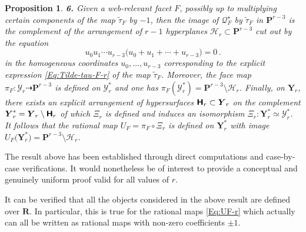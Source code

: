 \documentclass[11pt]{amsart}
\newcommand{\sk}{\smallskip}
\newtheorem{prop}[thm]{Proposition}
\begin{document}
\begin{prop}
\noindent 
{\bf 6.} Given a web-relevant facet $F$, possibly up to multiplying certain components of the map $\tilde \tau_F$ by $-1$, then the image of $\boldsymbol{\mathcal Q}_F^\star$ by $\tilde \tau_F$ in $\mathbf P^{r-3}$ is the complement of the arrangement of $r-1$ hyperplanes $\mathcal H_r\subset \mathbf P^{r-3}$ cut out by the equation 
$$
u_0u_1\cdots u_{r-3}\big( u_0+u_1+\cdots+  u_{r-3}\big)=0\, . 
$$
in the homogeneous coordinates $u_0,\ldots,u_{r-3}$ corresponding to the explicit expression \eqref{Eq:Tilde-tau-F-r} of the map $\tilde \tau_F$.  Moreover, 
the face map $\pi_F: \boldsymbol{\mathcal Y}_r\dashrightarrow \mathbf P^{r-3}$ is defined on $\boldsymbol{\mathcal Y}_r^*$ and one has $\pi_F( \boldsymbol{\mathcal Y}_r^*)=\mathbf P^{r-3}\setminus \mathcal H_r$. 
Finally, on $\boldsymbol{Y}_r$, there exists an explicit arrangement of hypersurfaces $\boldsymbol{\sf H}_r\subset \boldsymbol{Y}_r$ on the complement 
$\boldsymbol{Y}_r^*=\boldsymbol{Y}_r\setminus \boldsymbol{\sf H}_r$ of which $\Xi_r$ is defined and induces an isomorphism $\Xi_r : \boldsymbol{Y}_r^*\simeq \boldsymbol{\mathcal Y}_r^*$. It follows that the rational map $U_F= \pi_F\circ \Xi_r$ is defined on $\boldsymbol{Y}_r^*$ with image 
$U_F\big(\boldsymbol{Y}_r^*\big)=\mathbf P^{r-3}\setminus \mathcal H_r$. 
\end{prop} %


The result above has been established through direct computations and case-by-case verifications. It would nonetheless be of interest to provide a conceptual and genuinely uniform proof valid for all values of \( r \).\sk

It can be verified that all the objects considered in the above result are defined over $\mathbf R$. In particular, this is true for the rational maps \eqref{Eq:UF-r} which actually can all be written as rational maps with non-zero coefficients $\pm 1$. 



\end{document}
